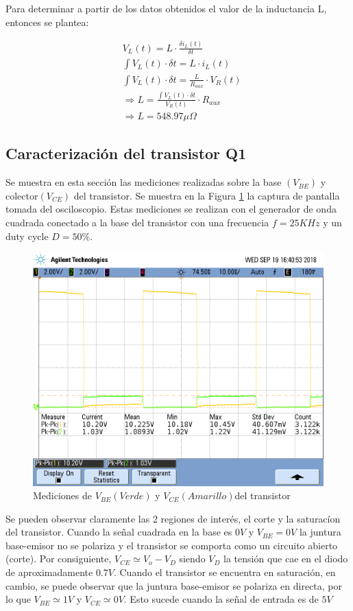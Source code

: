 Para determinar a partir de los datos obtenidos el valor de la inductancia L, entonces se plantea:

\begin{align*}
    & V_L(t) = L \cdot \frac{\delta i_L(t)}{\delta t} \\
    & \int V_L(t) \cdot \delta t = L \cdot i_L(t) \\
    & \int V_L(t) \cdot \delta t = \frac{L}{R_{aux}} \cdot V_R(t) \\
    & \Rightarrow L = \frac{\int V_L(t) \cdot \delta t}{V_R(t)} \cdot R_{aux} \\
    & \Rightarrow L = 548.97\mu \Omega
\end{align*}

\subsection{Caracterizaci\'on del transistor Q1}
\label{sec:TBJ_Q1}
Se muestra en esta secci\'on las mediciones realizadas sobre la base $(V_{BE})$ y colector$(V_{CE})$ del transistor. Se muestra en la Figura \ref{fig:vce_vbe} la captura de pantalla tomada del osciloscopio. Estas mediciones se realizan con el generador de onda cuadrada conectado a la base del transistor con una frecuencia $f = 25KHz$ y un duty cycle $D = 50\%$.

\begin{figure}[H]
    \centering
    \includegraphics[scale=0.4]{../Mediciones/f.png}
    \caption{Mediciones de $V_{BE}(Verde)$ y $V_{CE}(Amarillo)$del transistor}
    \label{fig:vce_vbe}
\end{figure}
Se pueden observar claramente las 2 regiones de inter\'es, el corte y la saturac\'ion del transistor.
Cuando la se\~nal cuadrada en la base es $0V$ y $V_{BE} = 0V$ la juntura base-emisor no se polariza y  el transistor se comporta como un circuito abierto (corte). Por consiguiente, $V_{CE} \simeq V_o - V_D$ siendo $V_D$ la tensi\'on que cae en el diodo de aproximadamente $0.7V$.
Cuando el transistor se encuentra en saturaci\'on, en cambio, se puede observar que la juntura base-emisor se polariza en directa, por lo que $V_{BE} \simeq 1V$ y $V_{CE} \simeq 0V$. Esto sucede cuando la se\~nal de entrada es de $5V$


